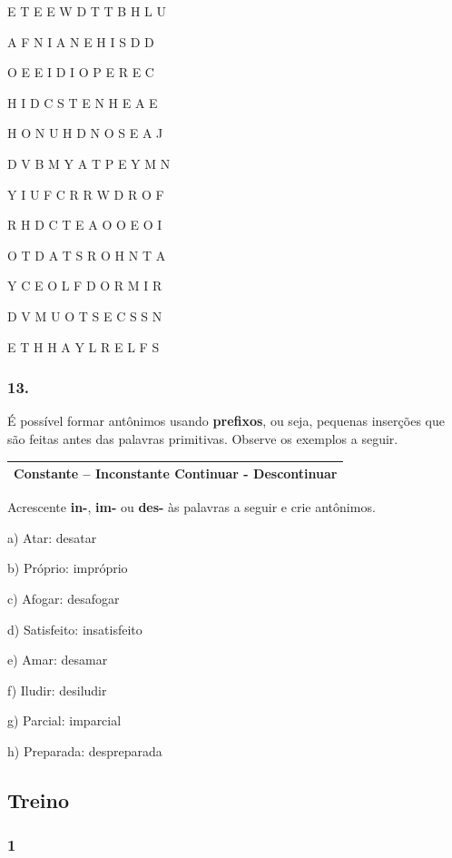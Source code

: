 E T E E W D T T B H L U

A F N I A N E H I S D D

O E E I D I O P E R E C

H I D C S T E N H E A E

H O N U H D N O S E A J

D V B M Y A T P E Y M N

Y I U F C R R W D R O F

R H D C T E A O O E O I

O T D A T S R O H N T A

Y C E O L F D O R M I R

D V M U O T S E C S S N

E T H H A Y L R E L F S

\subsubsection{13. }\label{section-12}

É possível formar antônimos usando \textbf{prefixos}, ou seja, pequenas inserções
que são feitas antes das palavras primitivas. Observe os exemplos a seguir.

\begin{longtable}[]{@{}l@{}}
\toprule
Constante -- \textbf{In}constante Continuar -
\textbf{Des}continuar\tabularnewline
\bottomrule
\end{longtable}

Acrescente \textbf{in-}, \textbf{im-} ou \textbf{des-} às palavras a seguir e crie antônimos.

a) Atar: desatar

b) Próprio: impróprio

c) Afogar: desafogar

d) Satisfeito: insatisfeito

e) Amar: desamar

f) Iludir: desiludir

g) Parcial: imparcial

h) Preparada: despreparada

\subsection{Treino}\label{treino}

\subsubsection{1 }\label{section-13}

